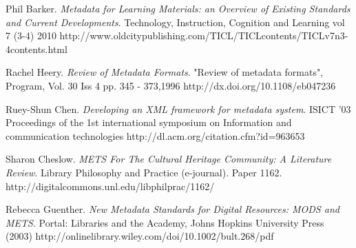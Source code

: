 \documentclass[a4paper]{article} %
\begin{document}
	\begin{thebibliography}{99}
		Phil Barker.
		\newblock \emph{Metadata for Learning Materials: an Overview of Existing Standards and Current Developments}.
		\newblock Technology, Instruction, Cognition and Learning vol 7 (3-4) 2010
		\newblock http://www.oldcitypublishing.com/TICL/TICLcontents/TICLv7n3-4contents.html
		
		
		Rachel Heery.
		\newblock \emph{Review of Metadata Formats}.
		\newblock "Review of metadata formats", Program, Vol. 30 Iss 4 pp. 345 - 373,1996
		\newblock http://dx.doi.org/10.1108/eb047236
		
		Ruey-Shun Chen.
		\newblock \emph{Developing an XML framework for metadata system}.
		\newblock ISICT '03 Proceedings of the 1st international symposium on Information and communication technologies
		\newblock http://dl.acm.org/citation.cfm?id=963653
		
		Sharon Cheslow.
		\newblock \emph{METS For The Cultural Heritage Community: A	Literature Review}.
		\newblock Library Philosophy and Practice (e-journal). Paper 1162.
		\newblock http://digitalcommons.unl.edu/libphilprac/1162/
		
		Rebecca Guenther.
		\newblock \emph{New Metadata Standards for Digital Resources: MODS and METS}.
		\newblock Portal: Libraries and the Academy, Johns Hopkins University Press (2003)
		\newblock http://onlinelibrary.wiley.com/doi/10.1002/bult.268/pdf
		
	\end{thebibliography}
	
	
	\clearpage %
	
	
	
\end{document}
